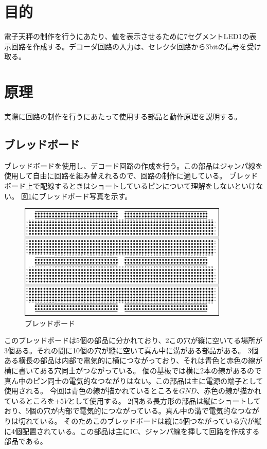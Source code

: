 \documentclass[a4paper,11pt,dvipdfmx]{jsarticle}
\begin{document}
\newpage
\section{目的}
電子天秤の制作を行うにあたり、値を表示させるために7セグメントLED1の表示回路を作成する。デコーダ回路の入力は、セレクタ回路から3bitの信号を受け取る。
\section{原理}
実際に回路の制作を行うにあたって使用する部品と動作原理を説明する。
\subsection{ブレッドボード}
ブレッドボードを使用し、デコード回路の作成を行う。この部品はジャンパ線を使用して自由に回路を組み替えれるので、回路の制作に適している。
ブレッドボード上で配線するときはショートしているピンについて理解をしないといけない。
図\ref{fig:breadboard}にブレッドボード写真を示す。
\begin{figure}[h]
  \centering
  \includegraphics[width=10cm]{./images/breadboard.drawio.png}
  \caption{ブレッドボード}
  \label{fig:breadboard}
\end{figure}
このブレッドボードは5個の部品に分かれており、2この穴が縦に空いてる場所が3個ある。それの間に10個の穴が縦に空いて真ん中に溝がある部品がある。
3個ある横長の部品は内部で電気的に横につながっており、それは青色と赤色の線が横に書いてある穴同士がつながっている。
個の基板では横に2本の線があるので真ん中のピン同士の電気的なつながりはない。この部品は主に電源の端子として使用される。
今回は青色の線が描かれているところを$GND$、赤色の線が描かれているところを$+5V$として使用する。
2個ある長方形の部品は縦にショートしており、5個の穴が内部で電気的につながっている。真ん中の溝で電気的なつながりは切れている。
そのためこのブレッドボードは縦に5個つながっている穴が縦に4個配置されている。この部品は主にIC、ジャンパ線を挿して回路を作成する部品である。
\end{document}
